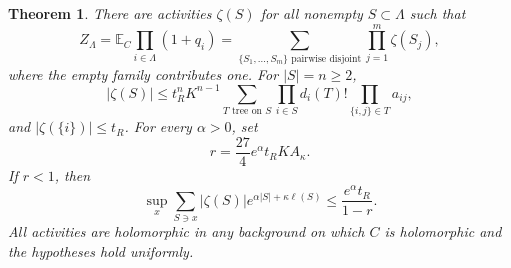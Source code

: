 \documentclass[11pt]{article}
\newtheorem{theorem}{Theorem}[section]
\theoremstyle{remark}
\newcommand{\E}{\mathbb E}
\begin{document}
\begin{theorem}\label{thm:polymer}
There are activities $\zeta(S)$ for all nonempty $S\subset\Lambda$
such that
\begin{equation}\label{eq:polymer-gas}
 Z_\Lambda=\E_C\prod_{i\in\Lambda}(1+q_i)
 =\sum_{\{S_1,\ldots,S_m\}\text{ pairwise disjoint}}
   \prod_{j=1}^m\zeta(S_j),
\end{equation}
where the empty family contributes one. For $|S|=n\ge2$,
\begin{equation}\label{eq:tree-bound}
 |\zeta(S)|\le t_R^nK^{n-1}
 \sum_{T\text{ tree on }S}
   \prod_{i\in S}d_i(T)!\prod_{\{i,j\}\in T}a_{ij},
\end{equation}
and $|\zeta(\{i\})|\le t_R$. For every $\alpha>0$, set
\[
 r=\frac{27}{4}e^\alpha t_RKA_\kappa.
\]
If $r<1$, then
\begin{equation}\label{eq:anchored-activities}
 \sup_x\sum_{S\ni x}|\zeta(S)|
     e^{\alpha|S|+\kappa\ell(S)}
 \le\frac{e^\alpha t_R}{1-r}.
\end{equation}
All activities are holomorphic in any background on which $C$ is
holomorphic and the hypotheses hold uniformly.
\end{theorem}
\end{document}
